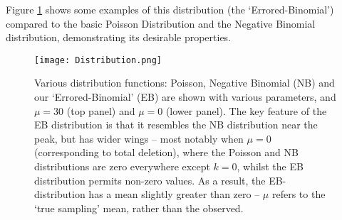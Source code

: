 \documentclass[fleqn,usenatbib]{mnras}
\begin{document}
				
				


				Figure \ref{Fig:Distributions} shows some examples of this distribution (the `Errored-Binomial') compared to the basic Poisson Distribution and the Negative Binomial distribution, demonstrating its desirable properties.

				\begin{figure}
							\texttt{[image: Distribution.png]}
							\caption{Various distribution functions: Poisson, Negative Binomial (NB) and our `Errored-Binomial' (EB) are shown with various parameters, and $\mu =30$ (top panel) and $\mu = 0$ (lower panel). The key feature of the EB distribution is that it resembles the NB distribution near the peak, but has wider wings -- most notably when $\mu = 0$ (corresponding to total deletion), where the Poisson and NB distributions are zero everywhere except $k=0$, whilst the EB distribution permits non-zero values. As a result, the EB-distribution has a mean slightly greater than zero -- $\mu$ refers to the `true sampling' mean, rather than the observed.}\label{Fig:Distributions}
						\end{figure}
			
\end{document}
